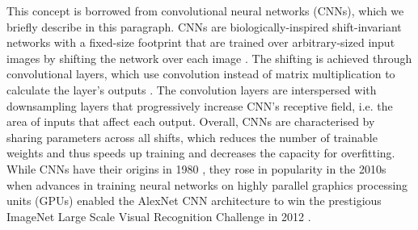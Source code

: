 \noindent This concept is borrowed from convolutional neural networks (CNNs), which we briefly describe in this paragraph. CNNs are biologically-inspired shift-invariant networks with a fixed-size footprint that are trained over arbitrary-sized input images by shifting the network over each image \cite{cnn-1990}. The shifting is achieved through convolutional layers, which use convolution instead of matrix multiplication to calculate the layer's outputs \cite{neocognitron-1980}. The convolution layers are interspersed with downsampling layers that progressively increase CNN's receptive field, i.e. the area of inputs that affect each output. Overall, CNNs are characterised by sharing parameters across all shifts, which reduces the number of trainable weights and thus speeds up training and decreases the capacity for overfitting. While CNNs have their origins in 1980 \cite{neocognitron-1980}, they rose in popularity in the 2010s when advances in training neural networks on highly parallel graphics processing units (GPUs) enabled the AlexNet CNN architecture to win the prestigious ImageNet Large Scale Visual Recognition Challenge in 2012 \cite{alexnet-2017}.

